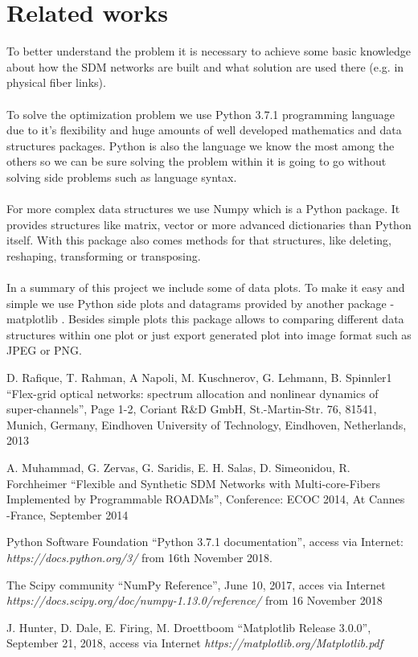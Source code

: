 \documentclass[conference]{IEEEtran}
\begin{document}
\section{Related works}
To better understand the problem it is necessary to achieve some basic knowledge about how the SDM networks are built and what solution are used there (e.g. in physical fiber links)\cite{b2}.
\\ \\
To solve the optimization problem we use Python 3.7.1\cite{b3} programming language due to it's flexibility and huge amounts of well developed mathematics and data structures packages. Python is also the language we know the most among the others so we can be sure solving the problem within it is going to go without solving side problems such as language syntax.
\\ \\
For more complex data structures we use Numpy \cite {b4} which is a Python package. It provides structures like matrix, vector or more advanced dictionaries than Python itself. With this package also comes methods for that structures, like deleting, reshaping, transforming or transposing.
\\ \\
In a summary of this project we include some of data plots. To make it easy and simple we use Python side plots and datagrams provided by another package - matplotlib \cite{b5}. Besides simple plots this package allows to comparing different data structures within one plot or just export generated plot into image format such as JPEG or PNG.

\begin{thebibliography}{00}

 D. Rafique, T. Rahman, A Napoli, M. Kuschnerov, G. Lehmann, B. Spinnler1 ``Flex-grid optical networks: spectrum allocation and nonlinear dynamics of super-channels'', Page 1-2, Coriant R\&D GmbH, St.-Martin-Str. 76, 81541, Munich, Germany, Eindhoven University of Technology, Eindhoven, Netherlands, 2013

 A. Muhammad, G. Zervas, G. Saridis, E. H. Salas, D. Simeonidou, R. Forchheimer ``Flexible and Synthetic SDM Networks with Multi-core-Fibers Implemented by Programmable ROADMs'', Conference: ECOC 2014, At Cannes -France, September 2014

 Python Software Foundation ``Python 3.7.1 documentation'', access via Internet: \textit{https://docs.python.org/3/} from 16th November 2018.

 The Scipy community ``NumPy Reference'', June 10, 2017, acces via Internet \textit{https://docs.scipy.org/doc/numpy-1.13.0/reference/} from 16 November 2018

 J. Hunter, D. Dale, E. Firing, M. Droettboom ``Matplotlib Release 3.0.0'', September 21, 2018, access via Internet \textit{https://matplotlib.org/Matplotlib.pdf}

\end{thebibliography}
\vspace{12pt}
\end{document}
